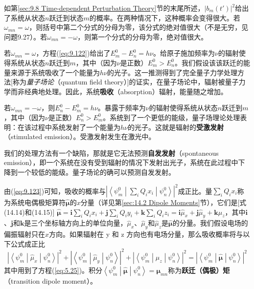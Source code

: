     如第\ref{sec:9.8 Time-dependent Perturbation Theory}节的末尾所述，$\left|b_m\left(t'\right)\right|^2$给出了系统从状态$n$跃迁到状态$m$的概率。在两种情况下，这种概率会变得很大。若$\omega_{mn} = \omega$，则括号中第二个分式的分母为零，该分式的绝对值很大（不是无穷，见问题9.27）。若$\omega_{mn} = -\omega$，则第一个分式的分母为零，绝对值很大。

    若$\omega_{mn} = \omega$，方程(\ref{eq:9.122})给出了$E_m^0 - E_n^0 = h\nu$。给原子施加频率为$\nu$的辐射使得系统从状态$n$跃迁到$m$，其中（因为$\nu$是正数）$E_m^0 > E_n^0$。我们假设该该跃迁的能量来源于系统吸收了一个能量为$h\nu$的光子。这一推测得到了完全量子力学处理方法[称为\textit{量子场论}（quantum field theory）]的证实，在量子场论中，辐射被量子力学而非经典地处理。因此，系统\textbf{吸收}（absorption）辐射，能量随之增加。

    若$\omega_{mn} = -\omega$，则$E_n^0 - E_m^0 = h\nu$。暴露于频率为$\nu$的辐射使得系统从状态$n$跃迁到$m$，其中（因为$\nu$是正数）$E_n^0 > E_m^0$。系统到了一个更低的能级，量子场理论处理表明：在该过程中系统发射了一个能量为$h\nu$的光子。这就是辐射的\textbf{受激发射}（stimulated emission）。受激发射发生在激光中。

    我们的处理方法有一个缺陷，那就是它无法预测\textbf{自发发射}（spontaneous emission），即一个系统在没有受到辐射的情况下发射出光子，系统在此过程中下降到一个较低的能级。量子场论的确可以预测自发发射。

    由(\ref{eq:9.123})可知，吸收的概率与$\left|\left\langle \psi_m^0 \middle| \sum_i Q_i x_i \middle| \psi_n^0 \right\rangle\right|^2$成正比。量$\sum_iQ_ix_i$称为系统电偶极矩算符$\hat{\mathbf{\mu}}$的$x$分量（详见第\ref{sec:14.2 Dipole Moments}节），它们是[式(14.14)和(14.15)]
    $\hat{\mathbf{\mu}} = \mathbf{i}\sum_i Q_i x_i + \mathbf{j}\sum_i Q_i y_i + \mathbf{k}\sum_i Q_i z_i = \mathbf{i}\hat{\mu}_x + \mathbf{j}\hat{\mu}_y + \mathbf{k}\hat{\mu}_z$，其中$\mathbf{i}$、$\mathbf{j}$和$\mathbf{k}$是三个坐标轴方向上的单位向量，$\hat{\mu}_x$、$\hat{\mu}_y$和$\hat{\mu}_z$是$\mathbf{\hat{\mu}}$的分量。我们假设电场的偏振辐射只在$x$方向。如果辐射在 y 和 z 方向也有电场分量，那么吸收概率将与以下公式成正比
    \begin{equation*}
        \left|\left\langle \psi_m^0 \middle| \hat{\mu}_x \middle| \psi_n^0 \right\rangle\right|^2 + \left|\left\langle \psi_m^0 \middle| \hat{\mu}_y \middle| \psi_n^0 \right\rangle\right|^2 + \left|\left\langle \psi_m^0 \middle| \hat{\mu}_z \middle| \psi_n^0 \right\rangle\right|^2 = \left|\left\langle \psi_m^0 \middle| \hat{\mathbf{\mu}} \middle| \psi_n^0 \right\rangle\right|^2
    \end{equation*}
    其中用到了方程(\ref{eq:5.25})。积分$\left\langle \psi_m^0 \middle| \mathbf{\hat{\mu}} \middle| \psi_n^0 \right\rangle = \mathbf{\mu}_{mn}$称为\textbf{跃迁（偶极）矩}（transition dipole moment）。

